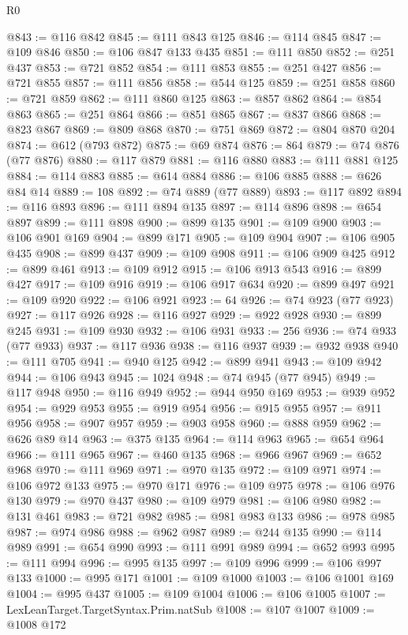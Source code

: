 \begin{lexlean}{R0}
\begin{coremodule}
@843 := @116 @842
@845 := @111 @843 @125
@846 := @114 @845
@847 := @109 @846
@850 := @106 @847 @133 @435
@851 := @111 @850
@852 := @251 @437
@853 := @721 @852
@854 := @111 @853
@855 := @251 @427
@856 := @721 @855
@857 := @111 @856
@858 := @544 @125
@859 := @251 @858
@860 := @721 @859
@862 := @111 @860 @125
@863 := @857 @862
@864 := @854 @863
@865 := @251 @864
@866 := @851 @865
@867 := @837 @866
@868 := @823 @867
@869 := @809 @868
@870 := @751 @869
@872 := @804 @870 @204
@874 := @612 (@793 @872)
@875 := @69 @874
@876 := 864
@879 := @74 @876 (@77 @876)
@880 := @117 @879
@881 := @116 @880
@883 := @111 @881 @125
@884 := @114 @883
@885 := @614 @884
@886 := @106 @885
@888 := @626 @84 @14
@889 := 108
@892 := @74 @889 (@77 @889)
@893 := @117 @892
@894 := @116 @893
@896 := @111 @894 @135
@897 := @114 @896
@898 := @654 @897
@899 := @111 @898
@900 := @899 @135
@901 := @109 @900
@903 := @106 @901 @169
@904 := @899 @171
@905 := @109 @904
@907 := @106 @905 @435
@908 := @899 @437
@909 := @109 @908
@911 := @106 @909 @425
@912 := @899 @461
@913 := @109 @912
@915 := @106 @913 @543
@916 := @899 @427
@917 := @109 @916
@919 := @106 @917 @634
@920 := @899 @497
@921 := @109 @920
@922 := @106 @921
@923 := 64
@926 := @74 @923 (@77 @923)
@927 := @117 @926
@928 := @116 @927
@929 := @922 @928
@930 := @899 @245
@931 := @109 @930
@932 := @106 @931
@933 := 256
@936 := @74 @933 (@77 @933)
@937 := @117 @936
@938 := @116 @937
@939 := @932 @938
@940 := @111 @705
@941 := @940 @125
@942 := @899 @941
@943 := @109 @942
@944 := @106 @943
@945 := 1024
@948 := @74 @945 (@77 @945)
@949 := @117 @948
@950 := @116 @949
@952 := @944 @950 @169
@953 := @939 @952
@954 := @929 @953
@955 := @919 @954
@956 := @915 @955
@957 := @911 @956
@958 := @907 @957
@959 := @903 @958
@960 := @888 @959
@962 := @626 @89 @14
@963 := @375 @135
@964 := @114 @963
@965 := @654 @964
@966 := @111 @965
@967 := @460 @135
@968 := @966 @967
@969 := @652 @968
@970 := @111 @969
@971 := @970 @135
@972 := @109 @971
@974 := @106 @972 @133
@975 := @970 @171
@976 := @109 @975
@978 := @106 @976 @130
@979 := @970 @437
@980 := @109 @979
@981 := @106 @980
@982 := @131 @461
@983 := @721 @982
@985 := @981 @983 @133
@986 := @978 @985
@987 := @974 @986
@988 := @962 @987
@989 := @244 @135
@990 := @114 @989
@991 := @654 @990
@993 := @111 @991 @989
@994 := @652 @993
@995 := @111 @994
@996 := @995 @135
@997 := @109 @996
@999 := @106 @997 @133
@1000 := @995 @171
@1001 := @109 @1000
@1003 := @106 @1001 @169
@1004 := @995 @437
@1005 := @109 @1004
@1006 := @106 @1005
@1007 := LexLeanTarget.TargetSyntax.Prim.natSub
@1008 := @107 @1007
@1009 := @1008 @172

\end{coremodule}
\end{lexlean}
